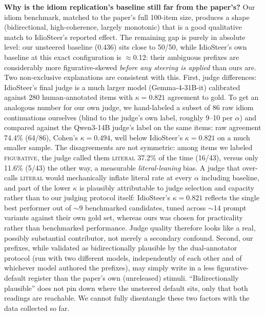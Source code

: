 \documentclass[11pt]{article}
\begin{document}
\textbf{Why is the idiom replication's baseline still far from the paper's?} Our idiom
benchmark, matched to the paper's full 100-item size, produces a shape (bidirectional,
high-coherence, largely monotonic) that is a good qualitative match to IdioSteer's
reported effect. The remaining gap is purely in absolute level: our unsteered baseline
(0.436) sits close to 50/50, while
IdioSteer's own baseline at this exact configuration is $\approx$0.12: their
ambiguous prefixes are considerably more figurative-skewed \emph{before any steering is
applied} than ours are. Two non-exclusive explanations are consistent with this.
First, judge differences: IdioSteer's final judge is a much larger model
(Gemma-4-31B-it) calibrated against 280 human-annotated items with $\kappa=0.821$
agreement to gold. To get an analogous number for our own judge, we hand-labeled a
subset of 86 raw idiom continuations ourselves (blind to the judge's own label, roughly
9--10 per $\alpha$) and compared against the Qwen3-14B judge's label on the same items:
raw agreement 74.4\% (64/86), Cohen's $\kappa=0.494$, well below IdioSteer's $\kappa=0.821$
on a much smaller sample. The disagreements are not symmetric: among items we labeled
\textsc{figurative}, the judge called them \textsc{literal} 37.2\% of the time (16/43),
versus only 11.6\% (5/43) the other way, a measurable \emph{literal-leaning} bias. A judge
that over-calls \textsc{literal} would mechanically inflate literal rate at every $\alpha$
including baseline, and part of the lower $\kappa$ is plausibly attributable to judge
selection and capacity rather than to our judging protocol itself: IdioSteer's
$\kappa=0.821$ reflects the single best performer out of $\sim$9 benchmarked candidates,
tuned across $\sim$14 prompt variants against their own gold set, whereas ours was chosen
for practicality rather than benchmarked performance. Judge quality therefore looks like
a real, possibly substantial contributor, not merely a secondary confound. Second, our
prefixes, while validated as bidirectionally plausible by
the dual-annotator protocol (run with two different models, independently of each other
and of whichever model authored the prefixes), may simply write in a less
figurative-default register than the paper's own (unreleased) stimuli. ``Bidirectionally
plausible'' does not pin down where the unsteered default sits, only that both readings
are reachable. We cannot fully disentangle these two factors with the data collected so
far.
\end{document}
